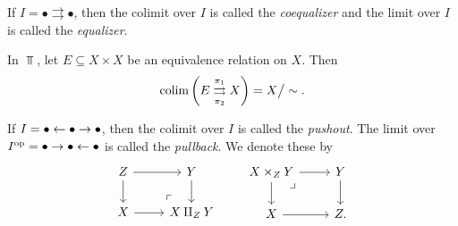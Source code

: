 \documentclass{article}[11pt]
\renewcommand{\dot}{\bullet }
\begin{document}
\begin{definition} If $I = \dot \rightrightarrows \dot$, then the colimit over $I$ is called the \textit{coequalizer} and the limit over $I$ is called the \textit{equalizer}.
\end{definition}

\begin{example} In $\Top$, let $E\subseteq X\times X$ be an equivalence relation on $X$. Then
	\begin{align*}
		\mathop{\operatorname*{colim}} \left( E \underset{\pi_2}{\overset{\pi_1}{\rightrightarrows}} X \right) = X\big/\sim.
	\end{align*}
\end{example}

\begin{definition} If $I = \dot \from \dot \to \dot$, then the colimit over $I$ is called the \textit{pushout}. The limit over $I^\op = \dot \to \dot \from \dot$ is called the \textit{pullback}. We denote these by
\[
	\begin{tikzcd}
	Z\dar\rar & Y\dar \\
	X\rar & X\amalg_Z Y\po
	\end{tikzcd}\quad\quad
	\begin{tikzcd}
	X\times_Z Y \pb\rar\dar & Y\dar \\
	X\rar & Z.
	\end{tikzcd}
\]
\end{definition}
\end{document}
